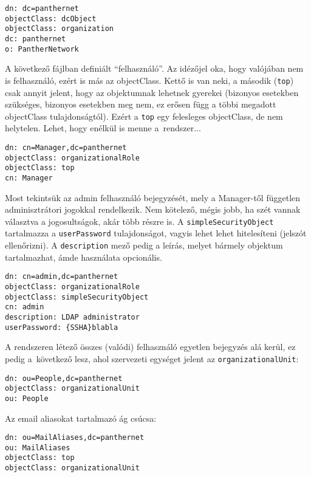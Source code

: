 \begin{Verbatim}[frame=single]
dn: dc=panthernet
objectClass: dcObject
objectClass: organization
dc: panthernet
o: PantherNetwork  
\end{Verbatim}


\noindent A következő  fájlban definiált ``felhasználó''. Az idézőjel oka, hogy valójában nem is
felhasználó, ezért is más az objectClass. Kettő is van neki, a második (\texttt{top}) csak annyit jelent, hogy az
objektumnak lehetnek gyerekei (bizonyos esetekben szükséges, bizonyos esetekben meg nem, ez erősen függ a többi megadott
objectClass tulajdonságtól). Ezért a \texttt{top} egy felesleges objectClass, de nem helytelen. Lehet, hogy enélkül is
menne a~rendszer...


\begin{Verbatim}[frame=single]
dn: cn=Manager,dc=panthernet
objectClass: organizationalRole
objectClass: top
cn: Manager
\end{Verbatim}

\noindent Most tekintsük az admin felhasználó bejegyzését, mely a Manager-től független adminisztrátori jogokkal
rendelkezik. Nem kötelező, mégis jobb, ha szét vannak választva a jogosultságok, akár több részre is. A
\texttt{simpleSecurityObject} tartalmazza a \texttt{userPassword} tulajdonságot, vagyis lehet lehet hitelesíteni
(jelszót ellenőrizni). A \texttt{description} mező pedig a leírás, melyet bármely objektum tartalmazhat, ámde használata
opcionális.


\begin{Verbatim}[frame=single]
dn: cn=admin,dc=panthernet
objectClass: organizationalRole
objectClass: simpleSecurityObject
cn: admin
description: LDAP administrator
userPassword: {SSHA}blabla
\end{Verbatim}


\noindent A rendszeren létező összes (valódi) felhasználó egyetlen bejegyzés alá kerül, ez pedig a~következő lesz, ahol
szervezeti egységet jelent az \texttt{organizationalUnit}:

\begin{Verbatim}[frame=single]
dn: ou=People,dc=panthernet
objectClass: organizationalUnit
ou: People  
\end{Verbatim}


\noindent Az email aliasokat tartalmazó ág csúcsa:

\begin{Verbatim}[frame=single]
dn: ou=MailAliases,dc=panthernet
ou: MailAliases
objectClass: top
objectClass: organizationalUnit
\end{Verbatim}


